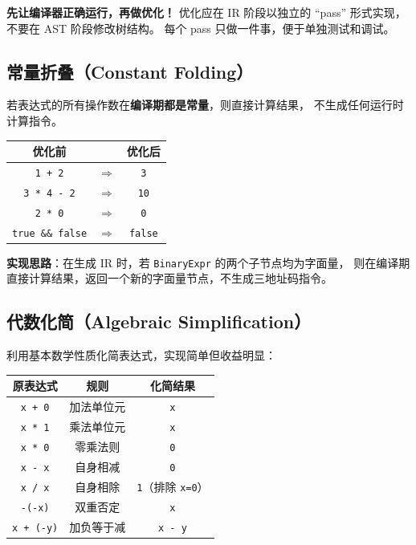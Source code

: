\documentclass[12pt, a4paper]{ctexart}
\begin{document}
\begin{warnbox}[优化的黄金原则]
\textbf{先让编译器正确运行，再做优化！}
优化应在 IR 阶段以独立的 ``pass'' 形式实现，不要在 AST 阶段修改树结构。
每个 pass 只做一件事，便于单独测试和调试。
\end{warnbox}

\subsection{常量折叠（Constant Folding）}

若表达式的所有操作数在\textbf{编译期都是常量}，则直接计算结果，
不生成任何运行时计算指令。

\begin{center}
\renewcommand{\arraystretch}{1.3}
\begin{tabular}{ccc}
\toprule
\textbf{优化前} & & \textbf{优化后} \\
\midrule
\texttt{1 + 2}           & $\Rightarrow$ & \texttt{3} \\
\texttt{3 * 4 - 2}       & $\Rightarrow$ & \texttt{10} \\
\texttt{2 * 0}           & $\Rightarrow$ & \texttt{0} \\
\texttt{true \&\& false} & $\Rightarrow$ & \texttt{false} \\
\bottomrule
\end{tabular}
\end{center}

\textbf{实现思路}：在生成 IR 时，若 \texttt{BinaryExpr} 的两个子节点均为字面量，
则在编译期直接计算结果，返回一个新的字面量节点，不生成三地址码指令。

\subsection{代数化简（Algebraic Simplification）}

利用基本数学性质化简表达式，实现简单但收益明显：

\begin{center}
\renewcommand{\arraystretch}{1.3}
\begin{tabular}{ccc}
\toprule
\textbf{原表达式} & \textbf{规则} & \textbf{化简结果} \\
\midrule
\texttt{x + 0}    & 加法单位元   & \texttt{x} \\
\texttt{x * 1}    & 乘法单位元   & \texttt{x} \\
\texttt{x * 0}    & 零乘法则     & \texttt{0} \\
\texttt{x - x}    & 自身相减     & \texttt{0} \\
\texttt{x / x}    & 自身相除     & \texttt{1}（排除 \texttt{x=0}） \\
\texttt{-(-x)}    & 双重否定     & \texttt{x} \\
\texttt{x + (-y)} & 加负等于减   & \texttt{x - y} \\
\bottomrule
\end{tabular}
\end{center}
\end{document}
